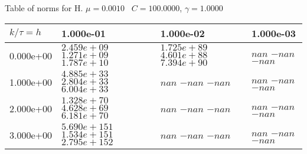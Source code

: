 \begin{center}
Table of norms for H. $\mu = 0.0010$ \, $C = 100.0000$, $\gamma = 1.0000$
  
\begin{tabular}{|p{1in}|p{1in}|p{1in}|p{1in}|} \hline
$k / \tau = h$ &1.000e-01 &1.000e-02 &1.000e-03 \\ \hline 
0.000e+00 & $2.459e+09$  $1.271e+09$  $1.787e+10$  & $1.725e+89$  $4.601e+88$  $7.394e+90$  & $nan$  $-nan$  $-nan$  \\ \hline 
1.000e+00 & $4.885e+33$  $2.804e+33$  $6.004e+33$  & $nan$  $-nan$  $-nan$  & $nan$  $-nan$  $-nan$  \\ \hline 
2.000e+00 & $1.328e+70$  $4.628e+69$  $6.181e+70$  & $nan$  $-nan$  $-nan$  & $nan$  $-nan$  $-nan$  \\ \hline 
3.000e+00 & $5.690e+151$  $1.534e+151$  $2.795e+152$  & $nan$  $-nan$  $-nan$  & $nan$  $-nan$  $-nan$  \\ \hline 

\end{tabular}\\[20pt]
\end{center}
